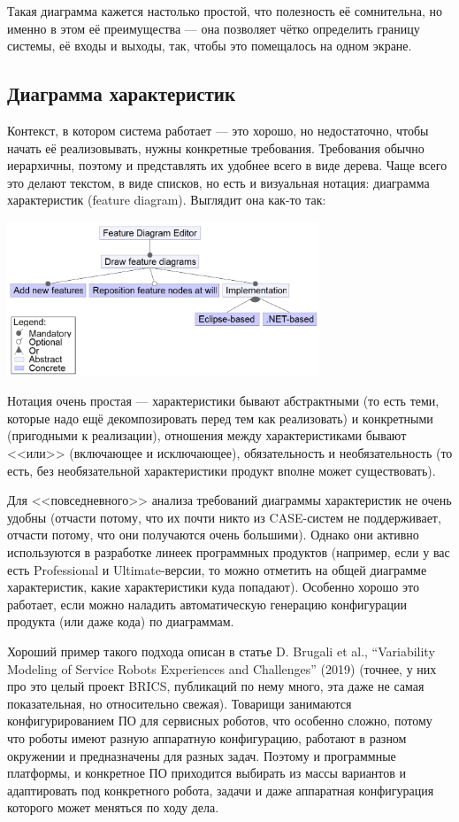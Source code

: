 \documentclass{../../text-style}
\begin{document}
Такая диаграмма кажется настолько простой, что полезность её сомнительна, но именно в этом её преимущества --- она позволяет чётко определить границу системы, её входы и выходы, так, чтобы это помещалось на одном экране.

\subsection{Диаграмма характеристик}

Контекст, в котором система работает --- это хорошо, но недостаточно, чтобы начать её реализовывать, нужны конкретные требования. Требования обычно иерархичны, поэтому и представлять их удобнее всего в виде дерева. Чаще всего это делают текстом, в виде списков, но есть и визуальная нотация: диаграмма характеристик (feature diagram). Выглядит она как-то так:

\begin{center}
    \includegraphics[width=0.7\textwidth]{featureDiagram.png}
\end{center}

Нотация очень простая --- характеристики бывают абстрактными (то есть теми, которые надо ещё декомпозировать перед тем как реализовать) и конкретными (пригодными к реализации), отношения между характеристиками бывают <<или>> (включающее и исключающее), обязательность и необязательность (то есть, без необязательной характеристики продукт вполне может существовать).

Для <<повседневного>> анализа требований диаграммы характеристик не очень удобны (отчасти потому, что их почти никто из CASE-систем не поддерживает, отчасти потому, что они получаются очень большими). Однако они активно используются в разработке линеек программных продуктов (например, если у вас есть Professional и Ultimate-версии, то можно отметить на общей диаграмме характеристик, какие характеристики куда попадают). Особенно хорошо это работает, если можно наладить автоматическую генерацию конфигурации продукта (или даже кода) по диаграммам.

Хороший пример такого подхода описан в статье D. Brugali et al., ``Variability Modeling of Service Robots Experiences and Challenges'' (2019) (точнее, у них про это целый проект BRICS, публикаций по нему много, эта даже не самая показательная, но относительно свежая). Товарищи занимаются конфигурированием ПО для сервисных роботов, что особенно сложно, потому что роботы имеют разную аппаратную конфигурацию, работают в разном окружении и предназначены для разных задач. Поэтому и программные платформы, и конкретное ПО приходится выбирать из массы вариантов и адаптировать под конкретного робота, задачи и даже аппаратная конфигурация которого может меняться по ходу дела.
\end{document}
